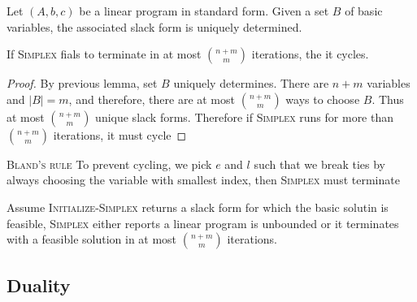 \documentclass[11pt]{article}
\begin{document}
\begin{lemma*}
    Let $(A,b,c)$ be a linear program in standard form. Given a set $B$ of basic variables, the associated slack form is uniquely determined. 
\end{lemma*}

\begin{lemma*}
    If \textsc{Simplex} fials to terminate in at most $\binom{n+m}{m}$ iterations, the it cycles. 
    \begin{proof}
        By previous lemma, set $B$ uniquely determines. There are $n+m$ variables and $|B| = m$, and therefore, there are at most $\binom{n+m}{m}$ ways to choose $B$. Thus at most $\binom{n+m}{m}$ unique slack forms. Therefore if \textsc{Simplex} runs for more than $\binom{n+m}{m}$ iterations, it must cycle
    \end{proof}
    
\end{lemma*}

\begin{lemma*}
    \textsc{Bland's rule} To prevent cycling, we pick $e$ and $l$ such that we break ties by always choosing the variable with smallest index, then \textsc{Simplex} must terminate
\end{lemma*}

\begin{lemma*}
    Assume \textsc{Initialize-Simplex} returns a slack form for which the basic solutin is feasible, \textsc{Simplex} either reports a linear program is unbounded or it terminates with a feasible solution in at most $\binom{n+m}{m}$  iterations. 
\end{lemma*}



\subsection*{Duality}


\begin{defn*}
    
\end{defn*}
\end{document}
